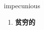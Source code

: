 
\begin{frame}
{\huge impecunious}
\begin{center}
\begin{enumerate}\Large
  \item \textbf{贫穷的}
\end{enumerate}
\end{center}
\end{frame}
